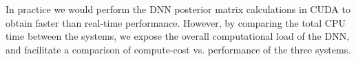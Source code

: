 \documentclass{article}
\begin{document}
In practice we would perform the DNN posterior matrix calculations in
CUDA to obtain faster than real-time performance.
However, by comparing the total CPU time between the systems, we 
expose the overall computational load of the DNN, and facilitate
a comparison of compute-cost vs. performance of the three systems. 




%
\end{document}
